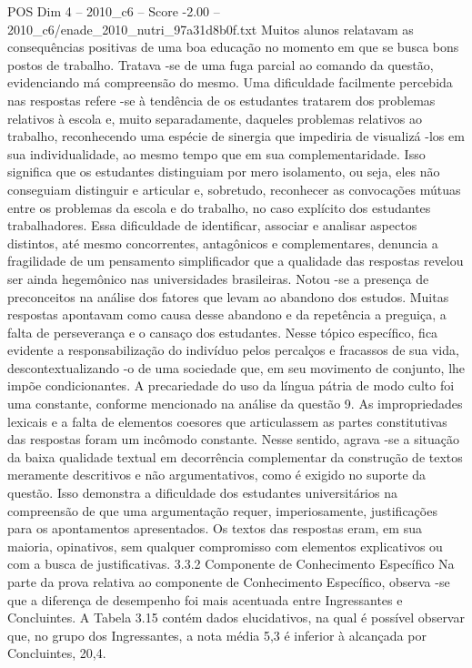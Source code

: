 \begin{textsample}{POS Dim 4 – 2010\_c6 – Score -2.00 – 2010\_c6/enade\_2010\_nutri\_97a31d8b0f.txt}
Muitos alunos relatavam as consequências positivas de uma boa educação no momento em que se busca bons postos de trabalho.
Tratava -se de uma fuga parcial ao comando da questão, evidenciando má compreensão do mesmo.
Uma dificuldade facilmente percebida nas respostas refere -se à tendência de os estudantes tratarem dos problemas relativos à escola e, muito separadamente, daqueles problemas relativos ao trabalho, reconhecendo uma espécie de sinergia que impediria de visualizá -los em sua individualidade, ao mesmo tempo que em sua complementaridade.
Isso significa que os estudantes distinguiam por mero isolamento, ou seja, eles não conseguiam distinguir e articular e, sobretudo, reconhecer as convocações mútuas entre os problemas da escola e do trabalho, no caso explícito dos estudantes trabalhadores.
Essa dificuldade de identificar, associar e analisar aspectos distintos, até mesmo concorrentes, antagônicos e complementares, denuncia a fragilidade de um pensamento simplificador que a qualidade das respostas revelou ser ainda hegemônico nas universidades brasileiras.
Notou -se a presença de preconceitos na análise dos fatores que levam ao abandono dos estudos.
Muitas respostas apontavam como causa desse abandono e da repetência a preguiça, a falta de perseverança e o cansaço dos estudantes.
Nesse tópico específico, fica evidente a responsabilização do indivíduo pelos percalços e fracassos de sua vida, descontextualizando -o de uma sociedade que, em seu movimento de conjunto, lhe impõe condicionantes.
A precariedade do uso da língua pátria de modo culto foi uma constante, conforme mencionado na análise da questão 9.
As impropriedades lexicais e a falta de elementos coesores que articulassem as partes constitutivas das respostas foram um incômodo constante.
Nesse sentido, agrava -se a situação da baixa qualidade textual em decorrência complementar da construção de textos meramente descritivos e não argumentativos, como é exigido no suporte da questão.
Isso demonstra a dificuldade dos estudantes universitários na compreensão de que uma argumentação requer, imperiosamente, justificações para os apontamentos apresentados.
Os textos das respostas eram, em sua maioria, opinativos, sem qualquer compromisso com elementos explicativos ou com a busca de justificativas. 3.3.2 Componente de Conhecimento Específico Na parte da prova relativa ao componente de Conhecimento Específico, observa -se que a diferença de desempenho foi mais acentuada entre Ingressantes e Concluintes.
A Tabela 3.15 contém dados elucidativos, na qual é possível observar que, no grupo dos Ingressantes, a nota média 5,3 é inferior à alcançada por Concluintes, 20,4.

\end{textsample}
